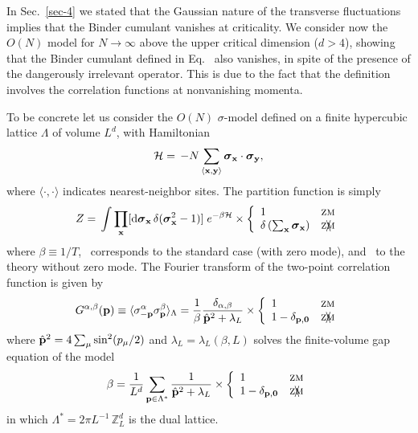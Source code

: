 \documentclass[12pt]{article}
\newcommand{\pos}[1]{\mathbf{#1}}
\begin{document}
In Sec.~\ref{sec-4} we stated that the Gaussian nature of the 
transverse fluctuations implies that the Binder cumulant vanishes
at criticality. We consider now the $O(N)$ model 
for $N\to\infty$ above the upper critical dimension ($d>4$), showing that the 
Binder cumulant defined in Eq.~ also 
vanishes, in spite of the presence of the 
dangerously irrelevant operator. This is due to the fact that the 
definition~ involves the correlation functions at 
nonvanishing momenta. 

To be concrete let us consider the $O(N)$ $\sigma$-model defined on a
finite hypercubic lattice $\Lambda$ of volume $L^d$, with Hamiltonian 
\begin{equation}
{\cal H} =\, - N \sum_{\langle\pos{x},\pos{y}\rangle}
\bsigma_\pos{x} \cdot \bsigma_\pos{y} ,
\end{equation}
where $\langle\cdot,\cdot\rangle$ indicates nearest-neighbor sites.
The partition function is simply
\begin{equation}
Z =\, \int \prod_\pos{x} [\dd\bsigma_\pos{x} \, 
\delta(\bsigma_\pos{x}^2-1)] \; e^{-\beta{\cal H}} \times
\left\{
\begin{array}{lc}
1 & \mbox{\zm} \\
\delta\left(\sum_{\pos{x}} \bsigma_\pos{x}\right)  & \mbox{\nzm} 
\end{array}
\right.
\end{equation}
where $\beta \equiv 1/T$, \zm\ corresponds to the standard case 
(with zero mode),
and \nzm\ to the theory without zero mode. 
The Fourier transform of the two-point correlation function is given by
\begin{equation}
G^{\alpha,\beta}(\ve{p}) \equiv \langle\sigma^\alpha_{-\ve{p}}
\sigma^\beta_{\ve{p}}\rangle_\Lambda =
\frac{1}{\beta}\frac{\delta_{\alpha,\beta}}{\hat{\ve{p}}^2 +
\lambda_L} \times
\left\{
\begin{array}{lc}
1 & \mbox{\zm} \\
1-\delta_{\ve{p},\ve{0}} & \mbox{\nzm} 
\end{array}
\right.
\end{equation}
where $\hat{{\bf p}}^2 = 4 \sum_\mu \sin^2(p_\mu/2)$
and $\lambda_L = \lambda_L(\beta,L)$ solves the finite-volume gap
equation of the model
\begin{equation}
\beta = {1\over L^d} \sum_{\pos{p}\in \Lambda^*}
\frac{1}{\hat{\ve{p}}^2 +
\lambda_L} \times
\left\{
\begin{array}{lc}
1 & \mbox{\zm} \\
1-\delta_{\ve{p},\ve{0}} & \mbox{\nzm} 
\end{array}
\right.
\end{equation}
in which
$\Lambda^* = {2\pi L^{-1}}\,\mathbb{Z}^d_{L}$
is the dual lattice. 
\end{document}
